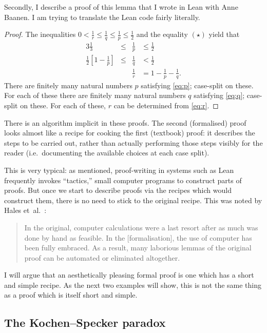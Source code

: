 \documentclass[12pt]{llncs}
\begin{document}
Secondly, I describe a proof of this lemma that I wrote in Lean with Anne Baanen.
I am trying to translate the Lean code fairly literally.


\begin{proof}
The inequalities
$0<\frac{1}{r}\le \frac{1}{q} \le \frac{1}{p} \le \frac{1}{2}$ and the equality $(\star)$ yield that
\begin{alignat}{3}
  \tfrac{1}{3}&\le& \tfrac{1}{p}&\le \tfrac{1}{2}\label{eq:p}\\
  \tfrac{1}{2}\left[1-\tfrac{1}{p}\right]&\le &\tfrac{1}{q}&<\tfrac{1}{2}\label{eq:q}\\
  &&\tfrac{1}{r}&=1-\tfrac{1}{p}-\tfrac{1}{q}.\label{eq:r}
\end{alignat}
There are finitely many natural numbers $p$ satisfying \cref{eq:p}; case-split on these.
For each of these there are finitely many natural numbers $q$ satisfying \cref{eq:q}; case-split on these.
For each of these, $r$ can be determined from \cref{eq:r}.
\end{proof}

There is an algorithm implicit in these proofs.
The second (formalised) proof looks almost like a recipe for cooking the first (textbook) proof:
it describes the steps to be carried out,
rather than actually performing those steps visibly for the reader
(i.e.\ documenting the available choices at each case split).

This is very typical:
as mentioned, proof-writing in systems such as Lean frequently invokes ``tactics,''
small computer programs to construct parts of proofs.
But once we start to describe proofs via the recipes which would construct them,
there is no need to stick to the original recipe.
This was noted by Hales et~al.~\cite{Hal17}:
\begin{quote}
In the original, computer calculations were a last resort after as much was done by
hand as feasible. In the [formalisation], the use of computer has been fully embraced.
As a result, many laborious lemmas of the original proof can be automated or
eliminated altogether.
\end{quote}
I will argue that an aesthetically pleasing formal proof is one which has a short and simple recipe.
As the next two examples will show,
this is not the same thing as a proof which is itself short and simple.


\subsection{The Kochen--Specker paradox}
\end{document}
